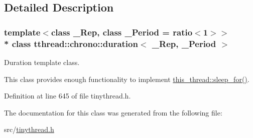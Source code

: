 \subsection{Detailed Description}
\subsubsection*{template$<$class \+\_\+\+Rep, class \+\_\+\+Period = ratio$<$1$>$$>$\\*
class tthread\+::chrono\+::duration$<$ \+\_\+\+Rep, \+\_\+\+Period $>$}

Duration template class. 

This class provides enough functionality to implement {\ttfamily \hyperlink{namespacetthread_1_1this__thread_a5dfe77c8ca4df7d32511caa2cb7ffa7f}{this\+\_\+thread\+::sleep\+\_\+for()}}. 

Definition at line 645 of file tinythread.\+h.



The documentation for this class was generated from the following file\+:\begin{DoxyCompactItemize}
\item 
src/\hyperlink{tinythread_8h}{tinythread.\+h}\end{DoxyCompactItemize}
